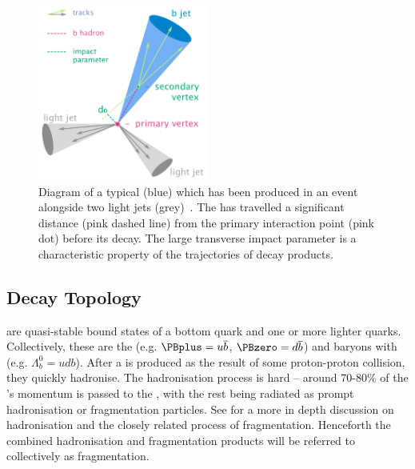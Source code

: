 \begin{figure}[!tbp]
  \centering
  \includegraphics[width=0.5\textwidth]{chapters/3.tracking/figs/b-jet-diagram.png}
  \caption{
    Diagram of a typical \bjet (blue) which has been produced in an event alongside two light jets (grey)~\cite{bjetdiagram}.
    The \bhadron has travelled a significant distance (pink dashed line) from the primary interaction point (pink dot) before its decay.
    The large transverse impact parameter \dzero is a characteristic property of the trajectories of \bhadron decay products.}
  \label{fig:bjet_diagram}
\end{figure}

\subsection{Decay Topology}
\label{sec:b_decay_topology}

\bhadrons are quasi-stable bound states of a bottom quark and one or more lighter quarks.
Collectively, these are the \bmesons (e.g. $\PBplus = u \overline{b}$, $\PBzero = d \overline{b}$) and baryons with (e.g. $\Lambda_b^0 = udb$).
After a \bquark is produced as the result of some proton-proton collision, they quickly hadronise.
The hadronisation process is hard -- around 70-80\% of the \bquark's momentum is passed to the \bhadron, with the rest being radiated as prompt hadronisation or fragmentation particles.
See  for a more in depth discussion on hadronisation and the closely related process of fragmentation.
Henceforth the combined hadronisation and fragmentation products will be referred to collectively as fragmentation.

